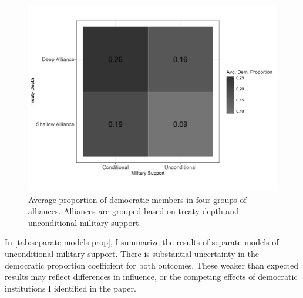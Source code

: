 \documentclass[12pt]{article}
\begin{document}
\begin{figure}
\includegraphics[width=.95\textwidth]{democ-prop-combo.png}  
\caption{Average proportion of democratic members in four groups of alliances. Alliances are grouped based on treaty depth and unconditional military support.}
\label{fig:democ-prop-combo}
\end{figure}


In \autoref{tab:separate-models-prop}, I summarize the results of separate models of unconditional military support.
There is substantial uncertainty in the democratic proportion coefficient for both outcomes. 
These weaker than expected results may reflect differences in influence, or the competing effects of democratic institutions I identified in the paper. 
\end{document}
